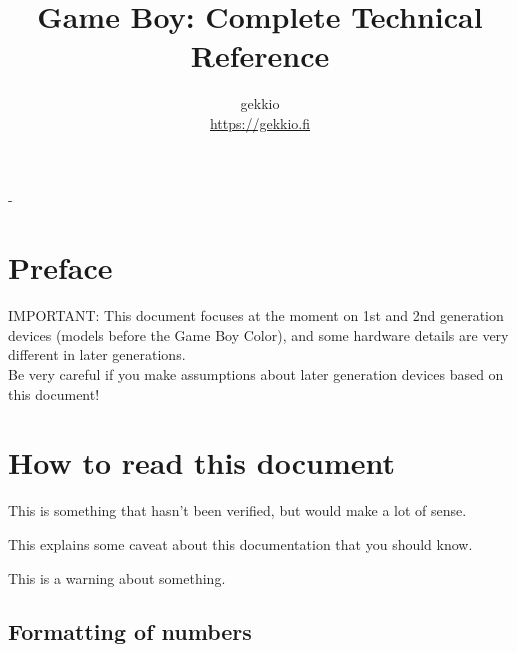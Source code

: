 \documentclass[a4paper, draft, oneside]{memoir}
\title{Game Boy: Complete Technical Reference}
\author{gekkio\\ \url{https://gekkio.fi}}
\begin{document}
\hypersetup{pageanchor=false}

\begin{titlingpage}
  \calccentering{\unitlength}
  \setlength{\droptitle}{80pt}
  \begin{adjustwidth*}{\unitlength}{-\unitlength}
    \maketitle
  \end{adjustwidth*}
\end{titlingpage}

\hypersetup{pageanchor=true}

\chapter*{Preface}

\begin{caveat}
  \Huge
  IMPORTANT: This document focuses at the moment on 1st and 2nd generation
  devices (models before the Game Boy Color), and some hardware details are
  very different in later generations. \\

  Be very careful if you make assumptions about later generation devices based
  on this document!
\end{caveat}

\chapter*{How to read this document}

\begin{speculation}
  This is something that hasn't been verified, but would make a lot of sense.
\end{speculation}

\begin{caveat}
  This explains some caveat about this documentation that you should know.
\end{caveat}

\begin{warning}
  This is a warning about something.
\end{warning}

\section{Formatting of numbers}
\end{document}
